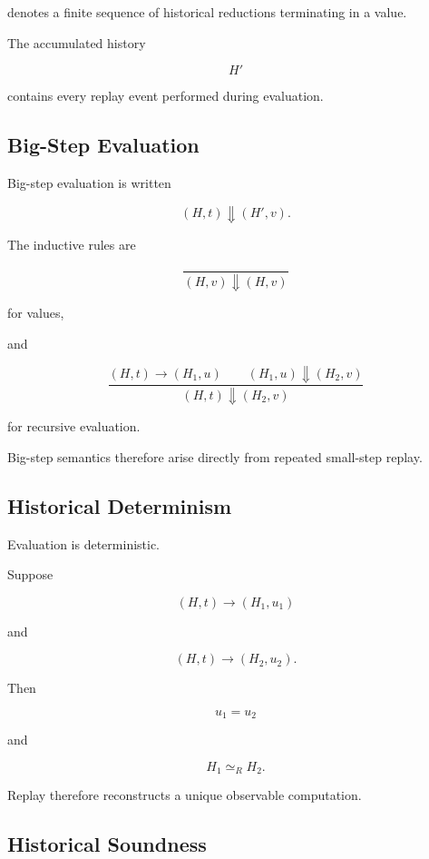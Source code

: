 \documentclass[12pt,oneside]{article}
\theoremstyle{definition}
\theoremstyle{remark}
\begin{document}
denotes a finite sequence of historical reductions terminating in a value.

The accumulated history

\[
H'
\]

contains every replay event performed during evaluation.


\subsection{Big-Step Evaluation}

Big-step evaluation is written

\[
(H,t)
\Downarrow
(H',v).
\]

The inductive rules are

\[
\frac{}{
(H,v)
\Downarrow
(H,v)
}
\]

for values,

and

\[
\frac{
(H,t)
\rightarrow
(H_1,u)
\qquad
(H_1,u)
\Downarrow
(H_2,v)
}{
(H,t)
\Downarrow
(H_2,v)
}
\]

for recursive evaluation.

Big-step semantics therefore arise directly from repeated small-step replay.


\subsection{Historical Determinism}

Evaluation is deterministic.

Suppose

\[
(H,t)
\rightarrow
(H_1,u_1)
\]

and

\[
(H,t)
\rightarrow
(H_2,u_2).
\]

Then

\[
u_1
=
u_2
\]

and

\[
H_1
\simeq_R
H_2.
\]

Replay therefore reconstructs a unique observable computation.


\subsection{Historical Soundness}
\end{document}
